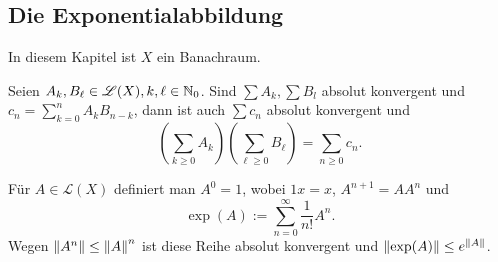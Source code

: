 \subsection{Die Exponentialabbildung}
In diesem Kapitel ist $X$ ein Banachraum.
\begin{satz}\label{satz4_10}
	Seien $A_k, B_\ell \in \mathscr{L}(X), k, \ell \in \mathbb{N}_0$. Sind $\sum A_k, \sum B_l$ absolut konvergent und $c_n = \sum_{k=0}^n A_k B_{n-k}$, dann ist auch $\sum c_n$ absolut konvergent und
	\[\left(\sum_{k\geq0} A_k\right)\left(\sum_{\ell \geq 0} B_\ell\right) = \sum_{n \geq 0} c_n.\]
\end{satz}
Für $A \in \mathscr{L}(X)$ definiert man $A^0 = 1$, wobei $1x = x$, $A^{n+1} = AA^n$ und
\[\exp(A) := \sum_{n = 0}^\infty \frac{1}{n!} A^n.\]
Wegen $\left\lVert A^n\right\rVert \leq \left\lVert A\right\rVert^n$ ist diese Reihe absolut konvergent und $\left\lVert\exp(A)\right\rVert \leq e^{\left\lVert A\right\rVert}$.
